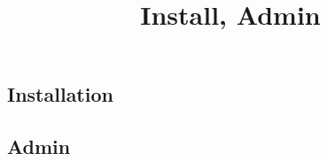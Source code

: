 \documentclass{article}
\begin{document}
\title{Install, Admin}

\maketitle


\subsection{Installation}\label{H7050896}






\subsection{Admin}\label{H3191967}
\end{document}
